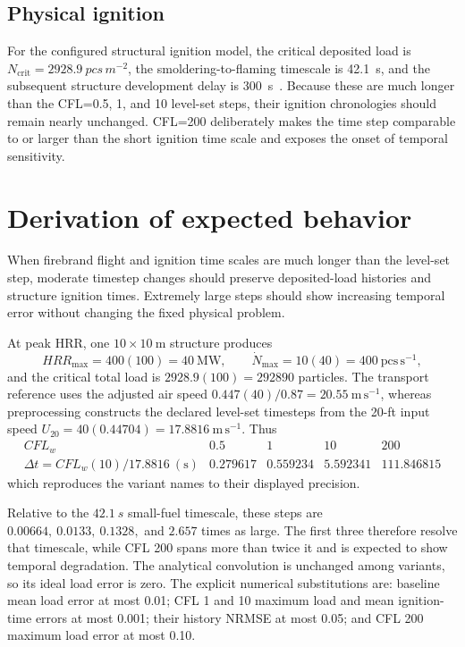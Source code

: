 \subsection{Physical ignition}

For the configured structural ignition model, the critical deposited load is
\(N_{\mathrm{crit}}=\SI{2928.9}{pcs\,m^{-2}}\), the
smoldering-to-flaming timescale is \SI{42.1}{s}, and the subsequent structure
development delay is \SI{300}{s}~\cite{Qin2025}. Because these are much longer
than the CFL=0.5, 1, and 10 level-set steps, their ignition chronologies should
remain nearly unchanged. CFL=200 deliberately makes the time step comparable
to or larger than the short ignition time scale and exposes the onset of
temporal sensitivity.

\section{Derivation of expected behavior}
When firebrand flight and ignition time scales are much longer than the level-set step, moderate timestep changes should preserve deposited-load histories and structure ignition times. Extremely large steps should show increasing temporal error without changing the fixed physical problem.

At peak HRR, one \(10\times10~\mathrm{m}\) structure produces
\[
 HRR_{\max}=400(100)=40~\mathrm{MW},\qquad
 \dot N_{\max}=10(40)=400~\mathrm{pcs\,s^{-1}},
\]
and the critical total load is
\(2928.9(100)=292890\) particles.  The transport reference uses the adjusted
air speed \(0.447(40)/0.87=20.55~\mathrm{m\,s^{-1}}\), whereas preprocessing
constructs the declared level-set timesteps from the 20-ft input speed
\(U_{20}=40(0.44704)=17.8816~\mathrm{m\,s^{-1}}\).  Thus
\[
\begin{array}{c|rrrr}
CFL_w&0.5&1&10&200\\\hline
\Delta t=CFL_w(10)/17.8816~(\mathrm{s})
&0.279617&0.559234&5.592341&111.846815
\end{array}
\]
which reproduces the variant names to their displayed precision.

Relative to the \(\SI{42.1}{s}\) small-fuel timescale, these steps are
\(0.00664,\ 0.0133,\ 0.1328,\) and \(2.657\) times as large.  The first
three therefore resolve that timescale, while CFL 200 spans more than twice
it and is expected to show temporal degradation.  The analytical convolution
is unchanged among variants, so its ideal load error is zero.  The explicit
numerical substitutions are: baseline mean load error at most 0.01; CFL 1
and 10 maximum load and mean ignition-time errors at most 0.001; their
history NRMSE at most 0.05; and CFL 200 maximum load error at most 0.10.


